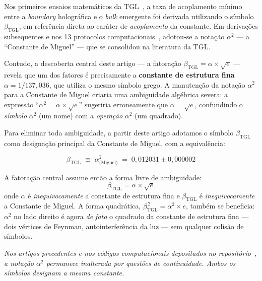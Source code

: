 \documentclass[12pt,a4paper,twoside]{article}
\newcommand{\betatgl}{\beta_{\!\scriptscriptstyle\mathrm{TGL}}}
\newcommand{\boundary}{\textit{boundary}}
\newcommand{\bulk}{\textit{bulk}}
\begin{document}
\begin{factorbox}[title={Nota sobre a evolução notacional}]
Nos primeiros ensaios matemáticos da TGL~\cite{Miguel2025Alpha2}, a taxa de acoplamento mínimo entre a \boundary{} holográfica e o \bulk{} emergente foi derivada utilizando o símbolo $\beta_{\mathrm{TGL}}$, em referência direta ao caráter de \textit{acoplamento} da constante. Em derivações subsequentes e nos 13 protocolos computacionais~\cite{Miguel2026Fronteira, Miguel2026LastString}, adotou-se a notação $\alpha^2$ --- a ``Constante de Miguel'' --- que se consolidou na literatura da TGL.

Contudo, a descoberta central deste artigo --- a fatoração $\betatgl = \alpha \times \sqrt{e}$ --- revela que um dos fatores é precisamente a \textbf{constante de estrutura fina} $\alpha = 1/137{,}036$, que utiliza o mesmo símbolo grego. A manutenção da notação $\alpha^2$ para a Constante de Miguel criaria uma ambiguidade algébrica severa: a expressão ``$\alpha^2 = \alpha \times \sqrt{e}$'' sugeriria erroneamente que $\alpha = \sqrt{e}$, confundindo o \textit{símbolo} $\alpha^2$ (um nome) com a \textit{operação} $\alpha^2$ (um quadrado).

Para eliminar toda ambiguidade, a partir deste artigo adotamos o símbolo $\betatgl$ como designação principal da Constante de Miguel, com a equivalência:
%
\begin{equationbox}[title={Equivalência notacional}]
\begin{equation}
\boxed{\;\betatgl \;\equiv\; \alpha^2_{\text{(Miguel)}} \;=\; 0{,}012031 \pm 0{,}000002\;}
\label{eq:equivalencia}
\end{equation}
\end{equationbox}
%
A fatoração central assume então a forma livre de ambiguidade:
%
\begin{equation}
\betatgl = \alpha \times \sqrt{e}
\label{eq:fatoracao_limpa}
\end{equation}
%
onde $\alpha$ é \textit{inequivocamente} a constante de estrutura fina e $\betatgl$ é \textit{inequivocamente} a Constante de Miguel. A forma quadrática, $\betatgl^{\,2} = \alpha^2 \times e$, também se beneficia: $\alpha^2$ no lado direito é agora \textit{de fato} o quadrado da constante de estrutura fina --- dois vértices de Feynman, autointerferência da luz --- sem qualquer colisão de símbolos.

\medskip
\noindent\textit{Nos artigos precedentes e nos códigos computacionais depositados no repositório~\cite{Miguel2026GitHub}, a notação $\alpha^2$ permanece inalterada por questões de continuidade. Ambos os símbolos designam a mesma constante.}
\end{factorbox}
\end{document}
